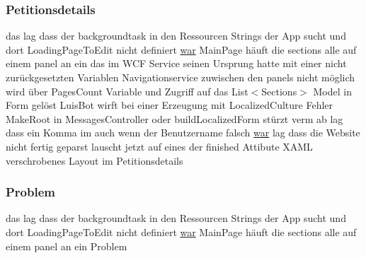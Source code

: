 \mbox{\label{_r_e_a_d_m_e_8txt_ab1eb46320c0ab46284b341bc594406ed}} 
\subsubsection{\texorpdfstring{Petitionsdetails}{Petitionsdetails}}
{\footnotesize\ttfamily das lag dass der backgroundtask in den Ressourcen Strings der App sucht und dort Loading\+Page\+To\+Edit nicht definiert \mbox{\hyperlink{_r_e_a_d_m_e_8txt_a2a72fc7da943588cba8c302409b22e53}{war}} Main\+Page häuft die sections alle auf einem panel an ein das im W\+CF Service seinen Ursprung hatte mit einer nicht zurückgesetzten Variablen Navigationservice zuwischen den panels nicht möglich wird über Pages\+Count Variable und Zugriff auf das List$<$Sections$>$ Model in Form gelöst Luis\+Bot wirft bei einer Erzeugung mit Localized\+Culture Fehler Make\+Root in Messages\+Controller oder build\+Localized\+Form stürzt verm ab lag dass ein Komma im auch wenn der Benutzername falsch \mbox{\hyperlink{_r_e_a_d_m_e_8txt_a2a72fc7da943588cba8c302409b22e53}{war}} lag dass die Website nicht fertig geparst lauscht jetzt auf eines der finished Attibute X\+A\+ML verschrobenes Layout im Petitionsdetails}

\mbox{\label{_r_e_a_d_m_e_8txt_a86dd00a8c1f3448e32e23bece4a957d6}} 
\subsubsection{\texorpdfstring{Problem}{Problem}}
{\footnotesize\ttfamily das lag dass der backgroundtask in den Ressourcen Strings der App sucht und dort Loading\+Page\+To\+Edit nicht definiert \mbox{\hyperlink{_r_e_a_d_m_e_8txt_a2a72fc7da943588cba8c302409b22e53}{war}} Main\+Page häuft die sections alle auf einem panel an ein Problem}

\mbox{\label{_r_e_a_d_m_e_8txt_a7cfea504e3a5e9a3a42e1f0a414a9efa}} 

